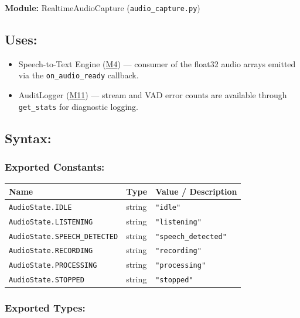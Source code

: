 \documentclass[12pt, titlepage]{article}
\begin{document}
\textbf{Module:} RealtimeAudioCapture (\texttt{audio\_capture.py})

\subsection{Uses:}
\begin{itemize}
  \item Speech-to-Text Engine (\hyperref[M4]{M4}) — consumer of the float32 audio arrays emitted via the \texttt{on\_audio\_ready} callback.
  \item AuditLogger (\hyperref[M11]{M11}) — stream and VAD error counts are available through \texttt{get\_stats} for diagnostic logging.
\end{itemize}

\subsection{Syntax:}

\subsubsection{Exported Constants:}

\begin{tabular}{|l|l|l|}
\hline
\textbf{Name} & \textbf{Type} & \textbf{Value / Description} \\ \hline
\texttt{AudioState.IDLE}            & string & \texttt{"idle"} \\ 
\texttt{AudioState.LISTENING}       & string & \texttt{"listening"} \\ 
\texttt{AudioState.SPEECH\_DETECTED}& string & \texttt{"speech\_detected"} \\ 
\texttt{AudioState.RECORDING}       & string & \texttt{"recording"} \\ 
\texttt{AudioState.PROCESSING}      & string & \texttt{"processing"} \\ 
\texttt{AudioState.STOPPED}         & string & \texttt{"stopped"} \\ \hline
\end{tabular}

\subsubsection{Exported Types:}
\end{document}
